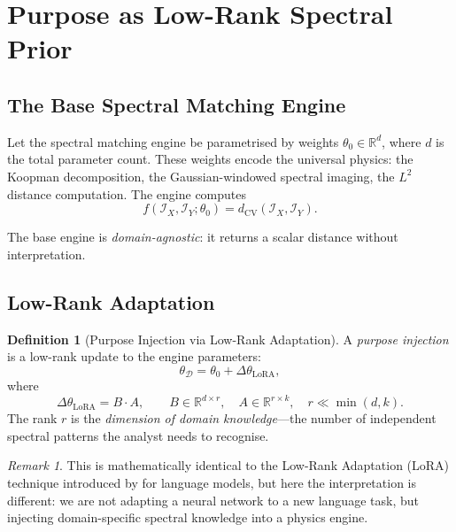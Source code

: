 \documentclass[11pt,twocolumn,a4paper]{article}
\theoremstyle{definition}
\newtheorem{definition}[theorem]{Definition}
\theoremstyle{remark}
\newtheorem{remark}[theorem]{Remark}
\newcommand{\dcv}{d_{\mathrm{CV}}}
\newcommand{\LoRA}{\mathrm{LoRA}}
\newcommand{\R}{\mathbb{R}}
\begin{document}
\section{Purpose as Low-Rank Spectral Prior}\label{sec:purpose-low-rank}

\subsection{The Base Spectral Matching Engine}

Let the spectral matching engine be parametrised by weights $\theta_0 \in \R^d$, where $d$ is the total parameter count.  These weights encode the universal physics: the Koopman decomposition, the Gaussian-windowed spectral imaging, the $L^2$ distance computation.  The engine computes
\begin{equation}\label{eq:base-engine}
    f(\mathcal{I}_X, \mathcal{I}_Y; \theta_0) = \dcv(\mathcal{I}_X, \mathcal{I}_Y).
\end{equation}

The base engine is \emph{domain-agnostic}: it returns a scalar distance without interpretation.

\subsection{Low-Rank Adaptation}

\begin{definition}[Purpose Injection via Low-Rank Adaptation]\label{def:lora}
A \emph{purpose injection} is a low-rank update to the engine parameters:
\begin{equation}\label{eq:lora-update}
    \theta_{\mathcal{D}} = \theta_0 + \Delta\theta_{\LoRA},
\end{equation}
where
\begin{equation}\label{eq:lora-decomposition}
    \Delta\theta_{\LoRA} = B \cdot A, \qquad B \in \R^{d \times r}, \quad A \in \R^{r \times k}, \quad r \ll \min(d, k).
\end{equation}
The rank $r$ is the \emph{dimension of domain knowledge}---the number of independent spectral patterns the analyst needs to recognise.
\end{definition}

\begin{remark}
This is mathematically identical to the Low-Rank Adaptation (LoRA) technique introduced by \citet{hu2022lora} for language models, but here the interpretation is different: we are not adapting a neural network to a new language task, but injecting domain-specific spectral knowledge into a physics engine.
\end{remark}
\end{document}
